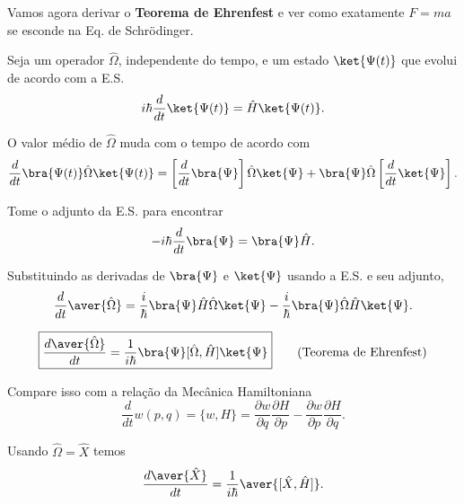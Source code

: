 Vamos agora derivar o \textbf{Teorema de Ehrenfest} e ver como exatamente $F = ma$ se esconde na Eq. de Schrödinger.

Seja um operador $\hat{\Omega}$, independente do tempo, e um estado $\ket{\Psi(t)}$ que evolui de acordo com a E.S.
\begin{equation}
    i\hbar \frac{d}{dt}\ket{\Psi(t)} = \hat{H}\ket{\Psi(t)}.
\label{eq:aula15_eq_schrodinger}
\end{equation}

O valor médio de $\hat{\Omega}$ muda com o tempo de acordo com
\begin{equation}
    \frac{d}{dt}\bra{\Psi(t)}\hat{\Omega}\ket{\Psi(t)} = \left[\frac{d}{dt}\bra{\Psi}\right]\hat{\Omega}\ket{\Psi} + \bra{\Psi}\hat{\Omega}\left[\frac{d}{dt}\ket{\Psi}\right].
\label{eq:aula15_dOmega_1}
\end{equation}

Tome o adjunto da E.S. para encontrar
\begin{equation}
    -i\hbar \frac{d}{dt}\bra{\Psi} = \bra{\Psi}\hat{H}.
\label{eq:aula15_adjunto_es}
\end{equation}

Substituindo as derivadas de $\bra{\Psi}$ e $\ket{\Psi}$ usando a E.S. e seu adjunto,
\begin{equation}
    \frac{d}{dt}\aver{\hat{\Omega}} = \frac{i}{\hbar}\bra{\Psi}\hat{H}\hat{\Omega}\ket{\Psi} - \frac{i}{\hbar}\bra{\Psi}\hat{\Omega}\hat{H}\ket{\Psi}.
\label{eq:aula15_dOmega_2}
\end{equation}

\begin{equation}
    \boxed{\frac{d\aver{\hat{\Omega}}}{dt} = \frac{1}{i\hbar}\bra{\Psi}[\hat{\Omega}, \hat{H}]\ket{\Psi}} \qquad \text{(Teorema de Ehrenfest)}
\label{eq:aula15_ehrenfest}
\end{equation}

Compare isso com a relação da Mecânica Hamiltoniana
\begin{equation}
    \frac{d}{dt}w(p,q) = \{w, H\} = \frac{\partial w}{\partial q}\frac{\partial H}{\partial p} - \frac{\partial w}{\partial p}\frac{\partial H}{\partial q}.
\label{eq:aula15_poisson_comparacao}
\end{equation}

Usando $\hat{\Omega} = \hat{X}$ temos
\begin{equation}
    \frac{d\aver{\hat{X}}}{dt} = \frac{1}{i\hbar}\aver{[\hat{X}, \hat{H}]}.
\label{eq:aula15_dX_ehrenfest}
\end{equation}

